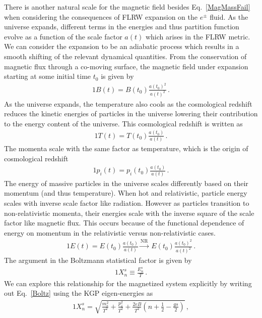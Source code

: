 \documentclass[Universe,article,submit,moreauthors,pdftex]{Definitions/mdpi}
\newcommand*{\req}[1]{Eq.~{\eqref{#1}}}
\begin{document}
There is another natural scale for the magnetic field besides \req{MagMassFail} when considering the consequences of FLRW expansion on the $e^{\pm}$ fluid. As the universe expands, different terms in the energies and thus partition function evolve as a function of the scale factor $a(t)$ which arises in the FLRW metric. We can consider the expansion to be an adiabatic process which results in a smooth shifting of the relevant dynamical quantities. From the conservation of magnetic flux through a co-moving surface, the magnetic field under expansion starting at some initial time $t_{0}$ is given by
\begin{alignat}{1}
    \label{BScale} B(t) = B(t_{0})\frac{a(t_{0})^{2}}{a(t)^{2}}\,.
\end{alignat}
As the universe expands, the temperature also cools as the cosmological redshift reduces the kinetic energies of particles in the universe lowering their contribution to the energy content of the universe. This cosmological redshift is written as
\begin{alignat}{1}
    \label{TScale} T(t) = T(t_{0})\frac{a(t_{0})}{a(t)}\,.
\end{alignat}
The momenta scale with the same factor as temperature, which is the origin of cosmological redshift
\begin{alignat}{1}
    \label{PScale} p_{i}(t) = p_{i}(t_{0})\frac{a(t_{0})}{a(t)}\,.
\end{alignat}
The energy of massive particles in the universe scales differently based on their momentum (and thus temperature). When hot and relativistic, particle energy scales with inverse scale factor like radiation. However as particles transition to non-relativistic momenta, their energies scale with the inverse square of the scale factor like magnetic flux. This occurs because of the functional dependence of energy on momentum in the relativistic versus non-relativistic cases.
\begin{alignat}{1}
    \label{EScale} E(t) = E(t_{0})\frac{a(t_{0})}{a(t)}\xrightarrow{\mathrm{NR}}\  E(t_{0})\frac{a(t_{0})^{2}}{a(t)^{2}}\,.
\end{alignat}
The argument in the Boltzmann statistical factor is given by
\begin{alignat}{1}
    \label{Boltz} X_{n}^{s}\equiv\frac{E_{n}^{s}}{T}\,.
\end{alignat}
We can explore this relationship for the magnetized system explicitly by writing out \req{Boltz} using the KGP eigen-energies as
\begin{alignat}{1}
    \label{XExplicit} X_{n}^{s} = \sqrt{\frac{m_{e}^{2}}{T^{2}}+\frac{p_{z}^{2}}{T^{2}}+\frac{2eB}{T^{2}}\left(n+\frac{1}{2}-\frac{gs}{2}\right)}\,,
\end{alignat}
\end{document}
